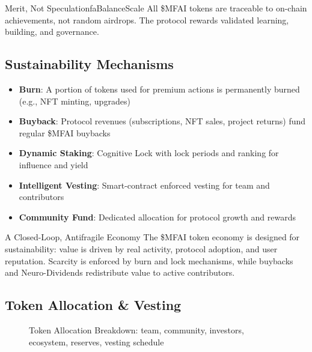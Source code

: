 \begin{mfai-note}{Merit, Not Speculation}{faBalanceScale}
All \$MFAI tokens are traceable to on-chain achievements, not random airdrops. The protocol rewards validated learning, building, and governance.
\end{mfai-note}

\subsection{Sustainability Mechanisms}
\begin{itemize}
    \item \faFire\quad \textbf{Burn}: A portion of tokens used for premium actions is permanently burned (e.g., NFT minting, upgrades)
    \item \faSync\quad \textbf{Buyback}: Protocol revenues (subscriptions, NFT sales, project returns) fund regular \$MFAI buybacks
    \item \faLock\quad \textbf{Dynamic Staking}: Cognitive Lock\texttrademark{} with lock periods and ranking for influence and yield
    \item \faClock\quad \textbf{Intelligent Vesting}: Smart-contract enforced vesting for team and contributors
    \item \faUsers\quad \textbf{Community Fund}: Dedicated allocation for protocol growth and rewards
\end{itemize}

\begin{mfai-box}{A Closed-Loop, Antifragile Economy}{}
The \$MFAI token economy is designed for sustainability: value is driven by real activity, protocol adoption, and user reputation. Scarcity is enforced by burn and lock mechanisms, while buybacks and Neuro-Dividends\texttrademark{} redistribute value to active contributors.
\end{mfai-box}

\subsection{Token Allocation \& Vesting}

\begin{figure}[H]
\centering
\begin{tikzpicture}
\end{tikzpicture}
\caption{Token Allocation Breakdown: team, community, investors, ecosystem, reserves, vesting schedule}
\end{figure}

